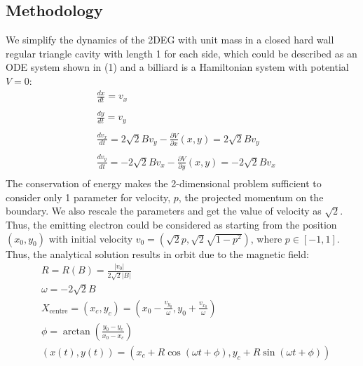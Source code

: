 \documentclass[a0,portrait]{a0poster}
\begin{document}
\begin{multicols}{3}
\section*{Methodology}

\noindent
We simplify the dynamics of the 2DEG with unit mass in a closed hard wall regular triangle cavity with length 1 for each side, which could be described as an ODE system shown in (1) and a billiard is a Hamiltonian system with potential $V=0$:
\begin{equation}
\begin{aligned}
& \frac{dx}{dt}=v_x\\
\\
& \frac{dy}{dt}=v_y\\
\\
& \frac{d v_x}{dt}=2\sqrt{2}Bv_y-\frac{\partial V}{\partial x}(x,y)=2\sqrt{2}Bv_y\\
\\
& \frac{d v_y}{dt}=-2\sqrt{2}Bv_x-\frac{\partial V}{\partial y}(x,y)=-2\sqrt{2}Bv_x\\
\end{aligned}
\end{equation}
The conservation of energy makes the 2-dimensional problem sufficient to consider only 1 parameter for velocity, $p$, the projected momentum on the boundary. We also rescale the parameters and get the value of velocity as $\sqrt{2}$. Thus, the emitting electron could be considered as starting from the position $(x_0,y_0)$ with initial velocity $v_0=(\sqrt{2}p,\sqrt{2}\sqrt{1-p^2})$, where $p \in [-1,1]$. Thus, the analytical solution results in orbit due to the magnetic field:
\begin{equation}
\begin{aligned}
& R=R(B)=\frac{|v_0|}{2\sqrt{2}|B|}\\
& \omega=-2\sqrt{2}B\\
& X_{\mathrm{centre}}=(x_c,y_c)=\left(x_0-\frac{v_{y_0}}{\omega},y_0+\frac{v_{x_0}}{\omega}\right)\\
& \phi=\arctan\left(\frac{y_0-y_c}{x_0-x_c}\right)\\
& (x(t),y(t))=\left(x_c+R\cos(\omega t+\phi), y_c+R\sin(\omega t+\phi)\right)\\
\end{aligned}
\end{equation}

\end{multicols}
\end{document}
